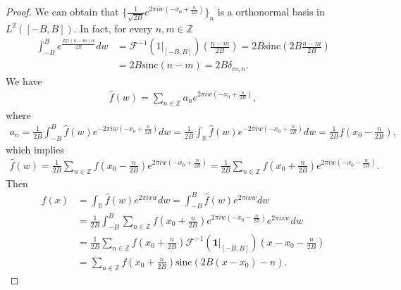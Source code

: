 \documentclass[12pt,oneside,reqno]{amsart}
\newcommand{\Z}{\mathbb{Z}}
\newcommand{\R}{\mathbb{R}}
\numberwithin{equation}{section}
\begin{document}
\begin{appendices}
\begin{proof}
		We can obtain that $\{\frac{1}{\sqrt{2B}} e^{2\pi iw (-x_0+ \frac{n}{2B})}\}_n$ is a orthonormal basis in $L^2([-B,B])$. In fact, for every $n,m\in \Z$
		\begin{align*}
			\int_{-B}^{B} e^{\frac{2\pi i(n-m)w}{2B}} dw {}& = \mathcal{F}^{-1} (\text{1}|_{[-B,B]}) (\frac{n-m}{2B}) = 2B \text{sinc} (2B \frac{n-m}{2B})\\
			{}& = 2B \text{sinc}(n-m) = 2B\delta_{m,n}.
		\end{align*}
		We have
		\begin{align*}
			\hat{f}(w) = \sum_{n\in \Z} a_n e^{2\pi iw (-x_0+\frac{n}{2B})},
		\end{align*}
		where
		\begin{align*}
			a_n = \frac{1}{2B} \int_{-B}^{B} \hat{f}(w) e^{- 2\pi iw (-x_0+\frac{n}{2B})} dw = \frac{1}{2B} \int_\R \hat{f}(w) e^{- 2\pi iw (-x_0+\frac{n}{2B})} dw = \frac{1}{2B} f(x_0 - \frac{n}{2B}),
		\end{align*}
		which implies
		\begin{align*}
			\hat{f}(w) = \frac{1}{2B} \sum_{n\in \Z} f(x_0 - \frac{n}{2B}) e^{2\pi iw (-x_0+\frac{n}{2B})} = \frac{1}{2B} \sum_{n\in \Z} f(x_0 + \frac{n}{2B}) e^{2\pi iw (-x_0-\frac{n}{2B})}.
		\end{align*}
		Then
		\begin{align*}
			f(x) {}& = \int_\R \hat{f} (w) e^{2\pi ixw} dw = \int_{-B}^B \hat{f} (w) e^{2\pi ixw} dw \\
			{}& = \frac{1}{2B} \int_{-B}^B \sum_{n\in \Z} f(x_0 + \frac{n}{2B}) e^{2\pi iw (-x_0-\frac{n}{2B})} e^{2\pi ixw} dw \\
			{}& = \frac{1}{2B} \sum_{n\in \Z} f(x_0 + \frac{n}{2B}) \mathcal{F}^{-1} (\textbf{1}|_{[-B,B]}) (x-x_0- \frac{n}{2B}) \\
			{}& = \sum_{n\in \Z} f(x_0 + \frac{n}{2B})  \text{sinc} (2B(x-x_0)-n).
		\end{align*}
	\end{proof}
	
	
	
	
\end{appendices}
\end{document}
